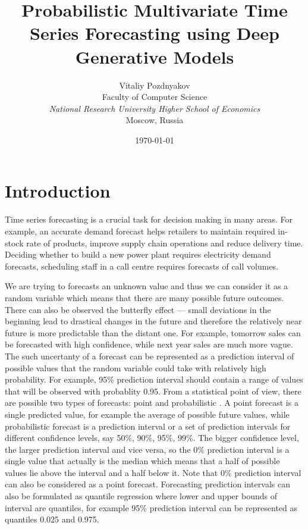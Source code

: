 \documentclass[12pt,a4paper]{article}
\title{Probabilistic Multivariate Time Series Forecasting using Deep Generative Models}
\date{\today}
\author{
    \small Vitaliy Pozdnyakov \\
    \small Faculty of Computer Science \\
    \small \textit{National Research University Higher School of Economics} \\
    \small Moscow, Russia\\
    }
\begin{document}


\newpage

\tableofcontents

\newpage

\section{Introduction}

Time series forecasting is a crucial task for decision making in many areas. For example, an accurate demand forecast helps retailers to maintain required in-stock rate of products, improve supply chain operations and reduce delivery time. Deciding whether to build a new power plant requires electricity demand forecasts, scheduling staff in a call centre requires forecasts of call volumes. 

We are trying to forecasts an unknown value and thus we can consider it as a random variable which means that there are many possible future outcomes. There can also be observed the butterfly effect — small deviations in the beginning lead to drastical changes in the future and therefore the relatively near future is more predictable than the distant one. For example, tomorrow sales can be forecasted with high confidence, while next year sales are much more vague. The such uncertanty of a forecast can be represented as a prediction interval of possible values that the random variable could take with relatively high probability. For example, 95\% prediction interval should contain a range of values that will be observed with probablity 0.95. From a statistical point of view, there are possible two types of forecasts: point and probabilistic \cite{fpp3}. A point forecast is a single predicted value, for example the average of possible future values, while probabilistic forecast is a prediction interval or a set of prediction intervals for different confidence levels, say 50\%, 90\%, 95\%, 99\%. The bigger confidence level, the larger prediction interval and vice versa, so the 0\% prediction interval is a single value that actually is the median which means that a half of possible values lie above the interval and a half below it. Note that 0\% prediction interval can also be considered as a point forecast. Forecasting prediction intervals can also be formulated as quantile regression where lower and upper bounds of interval are quantiles, for example 95\% prediction interval can be represented as quantiles 0.025 and 0.975.
\end{document}
